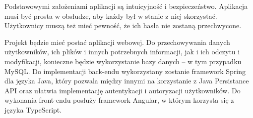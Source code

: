\documentclass[a4paper,twoside,12pt]{book}
\begin{document}
Podstawowymi założeniami aplikacji są intuicyjność i bezpieczeństwo. Aplikacja musi być prosta w obsłudze, aby każdy był w stanie z niej skorzystać. Użytkownicy muszą też mieć pewność, że ich hasła nie zostaną przechwycone.

Projekt będzie mieć postać aplikacji webowej. Do przechowywania danych użytkowników, ich plików i innych potrzebnych informacji, jak i ich odczytu i modyfikacji, konieczne będzie wykorzystanie bazy danych -- w tym przypadku MySQL. Do implementacji back-endu wykorzystany zostanie framework Spring dla języka Java, który pozwala między innymi na korzystanie z Java Persistance API oraz ułatwia implementację autentykacji i autoryzacji użytkowników. Do wykonania front-endu posłuży framework Angular, w którym korzysta się z języka TypeScript.






\end{document}
